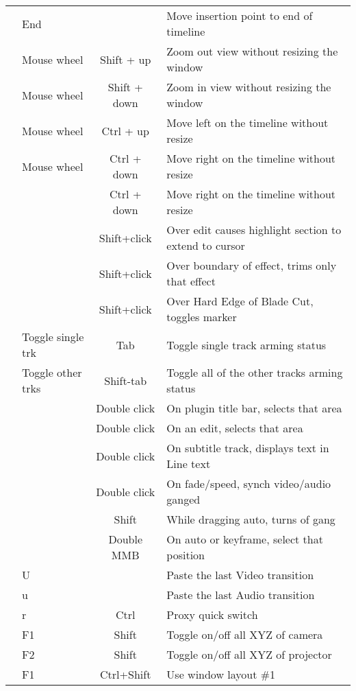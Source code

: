 \begin{center}
\begin{longtable}{ >{\bfseries}c l c p{6cm}}
        & End &  & Move insertion point to end of timeline \\        
        & Mouse wheel & Shift + up & Zoom out view without resizing the window \\        
        & Mouse wheel & Shift + down & Zoom in view without resizing the window \\        
        & Mouse wheel & Ctrl + up & Move left on the timeline without resize \\        
        & Mouse wheel & Ctrl + down & Move right on the timeline without resize \\        
        &  & Ctrl + down & Move right on the timeline without resize \\        
        &  & Shift+click & Over edit causes highlight section to extend to cursor \\        
        &  & Shift+click & Over boundary of effect, trims only that effect \\        
        &  & Shift+click & Over Hard Edge of Blade Cut, toggles marker \\        
        & Toggle single trk & Tab & Toggle single track arming status \\        
        & Toggle other trks & Shift-tab & Toggle all of the other tracks arming status \\        
        &  & Double click & On plugin title bar, selects that area \\        
        &  & Double click & On an edit, selects that area \\        
        &  & Double click & On subtitle track, displays text in Line text \\        
        &  & Double click & On fade/speed, synch video/audio ganged \\        
        &  & Shift & While dragging auto, turns of gang \\        
        &  & Double MMB & On auto or keyframe, select that position \\        
        & U &  & Paste the last Video transition \\        
        & u &  & Paste the last Audio transition \\        
        & r & Ctrl & Proxy quick switch \\        
        & F1 & Shift & Toggle on/off all XYZ of camera \\        
        & F2 & Shift & Toggle on/off all XYZ of projector \\        
        & F1 & Ctrl+Shift & Use window layout \#1 \\        

\end{longtable}
\end{center}
